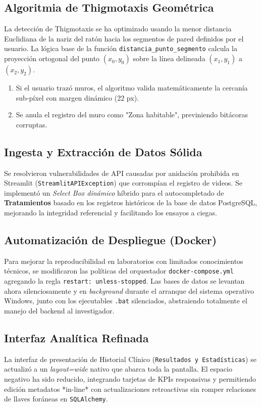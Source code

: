 \documentclass[12pt,a4paper]{article}
\begin{document}
\subsection{Algoritmia de Thigmotaxis Geométrica}
La detección de Thigmotaxis se ha optimizado usando la menor distancia Euclidiana de la nariz del ratón hacia los segmentos de pared definidos por el usuario. La lógica base de la función \texttt{distancia\_punto\_segmento} calcula la proyección ortogonal del punto $(x_0, y_0)$ sobre la línea delineada $(x_1, y_1)$ a $(x_2, y_2)$.
\begin{enumerate}
    \item Si el usuario trazó muros, el algoritmo valida matemáticamente la cercanía sub-píxel con margen dinámico (22 px).
    \item Se anula el registro del muro como "Zona habitable", previniendo bitácoras corruptas.
\end{enumerate}

\subsection{Ingesta y Extracción de Datos Sólida}
Se resolvieron vulnerabilidades de API causadas por anidación prohibida en Streamlit (\texttt{StreamlitAPIException}) que corrompían el registro de videos. Se implementó un \textit{Select Box dinámico} híbrido para el autocompletado de \textbf{Tratamientos} basado en los registros históricos de la base de datos PostgreSQL, mejorando la integridad referencial y facilitando los ensayos a ciegas.

\subsection{Automatización de Despliegue (Docker)}
Para mejorar la reproducibilidad en laboratorios con limitados conocimientos técnicos, se modificaron las políticas del orquestador \texttt{docker-compose.yml} agregando la regla \texttt{restart: unless-stopped}. Las bases de datos se levantan ahora silenciosamente y en \textit{background} durante el arranque del sistema operativo Windows, junto con los ejecutables \texttt{.bat} silenciados, abstraiendo totalmente el manejo del backend al investigador.

\subsection{Interfaz Analítica Refinada}
La interfaz de presentación de Historial Clínico (\texttt{Resultados y Estadísticas}) se actualizó a un \textit{layout=wide} nativo que abarca toda la pantalla. El espacio negativo ha sido reducido, integrando tarjetas de KPIs responsivas y permitiendo edición metadatos *in-line* con actualizaciones retroactivas sin romper relaciones de llaves foráneas en \texttt{SQLAlchemy}.
\end{document}

